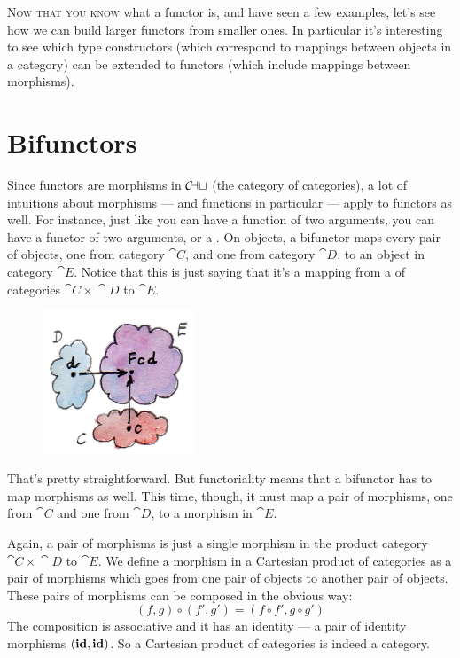 
\lettrine[lhang=0.17]{N}{ow that you know} what a functor is, and have seen a few examples, let's
see how we can build larger functors from smaller ones. In particular
it's interesting to see which type constructors (which correspond to
mappings between objects in a category) can be extended to functors
(which include mappings between morphisms).

\section{Bifunctors}

Since functors are morphisms in $\mathcal{C\mkern-3mu at}$ (the category of categories),
a lot of intuitions about morphisms --- and functions in particular ---
apply to functors as well. For instance, just like you can have a
function of two arguments, you can have a functor of two arguments, or a
. On objects, a bifunctor maps every pair of objects,
one from category $\cat{C}$, and one from category $\cat{D}$, to an object in category
$\cat{E}$. Notice that this is just saying that it's a mapping from a
 of categories $\cat{C}\times{}\cat{D}$ to $\cat{E}$.

\begin{figure}[H]
\centering\includegraphics[width=0.4\textwidth]{images/bifunctor.jpg}
\end{figure}

\noindent
That's pretty straightforward. But functoriality means that a bifunctor
has to map morphisms as well. This time, though, it must map a pair of
morphisms, one from $\cat{C}$ and one from $\cat{D}$, to a morphism in $\cat{E}$.

Again, a pair of morphisms is just a single morphism in the product
category $\cat{C}\times{}\cat{D}$ to $\cat{E}$. We define a morphism in a Cartesian product of categories
as a pair of morphisms which goes from one pair of objects to another
pair of objects. These pairs of morphisms can be composed in the obvious
way:
\[(f, g) \circ (f', g') = (f \circ f', g \circ g')\]
The composition is associative and it has an identity --- a pair of
identity morphisms $(\mathbf{id}, \mathbf{id})$. So a Cartesian product of categories
is indeed a category.

